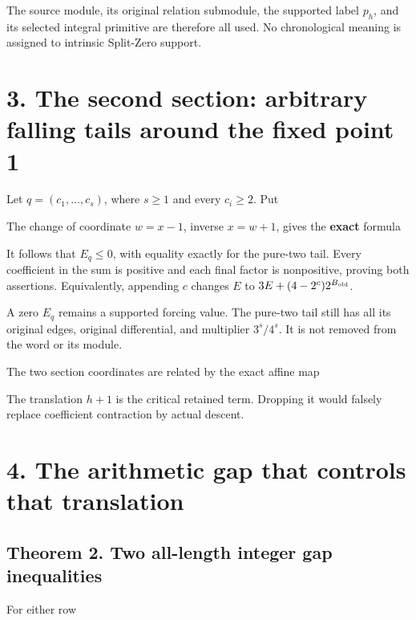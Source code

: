 The source module, its original relation submodule, the supported label
\(p_h\), and its selected integral primitive are therefore all used. No
chronological meaning is assigned to intrinsic Split-Zero support.

\section{3. The second section: arbitrary falling tails around the fixed
point 1}

Let \(q=(c_1,\ldots,c_s)\), where \(s\ge1\) and every \(c_i\ge2\). Put


The change of coordinate \(w=x-1\), inverse \(x=w+1\), gives the
\textbf{exact} formula


It follows that \(E_q\le0\), with equality exactly for the pure-two
tail. Every coefficient in the sum is positive and each final factor is
nonpositive, proving both assertions. Equivalently, appending \(c\)
changes \(E\) to \(3E+(4-2^c)2^{B_{\rm old}}\).

A zero \(E_q\) remains a supported forcing value. The pure-two tail
still has all its original edges, original differential, and multiplier
\(3^s/4^s\). It is not removed from the word or its module.

The two section coordinates are related by the exact affine map


The translation \(h+1\) is the critical retained term. Dropping it would
falsely replace coefficient contraction by actual descent.

\section{4. The arithmetic gap that controls that translation}

\subsection{Theorem 2. Two all-length integer gap inequalities}

For either row

